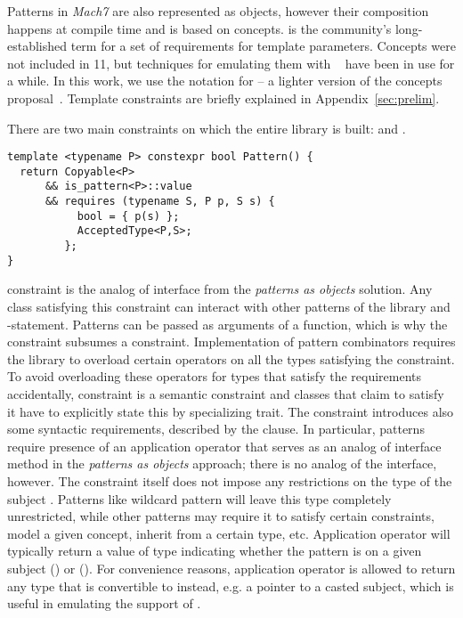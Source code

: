 Patterns in \emph{Mach7} are also represented as objects, however their 
composition happens at compile time and is based on \Cpp{} concepts. 
 is the \Cpp{} community's long-established term for a set of 
requirements for template parameters. Concepts were not included in \Cpp{}11, 
but techniques for emulating them with 
~\cite{jarvi:03:cuj_arbitrary_overloading} have been in use for 
a while. In this work, we use the notation for  -- a 
lighter version of the concepts proposal~\cite{N3580}. Template constraints are 
briefly explained in Appendix~\ref{sec:prelim}.

There are two main constraints on which the entire library is built: 
 and .

\begin{lstlisting}
template <typename P> constexpr bool Pattern() {
  return Copyable<P>
      && is_pattern<P>::value
      && requires (typename S, P p, S s) {
           bool = { p(s) };
           AcceptedType<P,S>;
         };
}
\end{lstlisting}

\noindent
{} constraint is the analog of  interface from the 
\emph{patterns as objects} solution. Any class satisfying this constraint can 
interact with other patterns of the library and -statement. Patterns 
can be passed as arguments of a function, which is why the constraint subsumes a
 constraint. Implementation of pattern combinators requires the 
library to overload certain operators on all the types satisfying the 
constraint. To avoid overloading these operators for types that satisfy the 
requirements accidentally,  constraint is a semantic constraint 
and classes that claim to satisfy it have to explicitly state this by specializing  
 trait. The constraint introduces also some syntactic 
requirements, described by the  clause. In particular, patterns 
require presence of an application operator that serves as an analog of 
 interface method in the \emph{patterns as 
objects} approach; there is no analog of the  interface, however. 
The  constraint itself does not impose any restrictions on the 
type of the subject . Patterns like wildcard pattern will leave this 
type completely unrestricted, while other patterns may require it to satisfy 
certain constraints, model a given concept, inherit from a certain type, etc.
Application operator will typically return a value of type  
indicating whether the pattern is  on a given subject 
() or  (). For convenience reasons, 
application operator is allowed to return any type that is convertible to 
 instead, e.g. a pointer to a casted subject, which is useful in 
emulating the support of .

